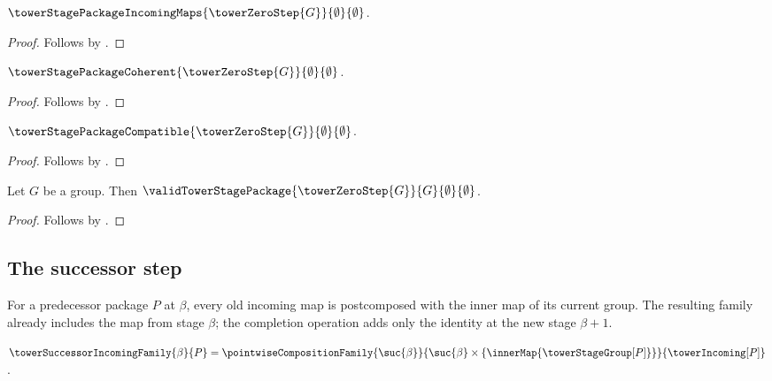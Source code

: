 \begin{proposition}\label{tower_zero_step_incoming_maps}
    $\towerStagePackageIncomingMaps
        {\towerZeroStep{G}}{\emptyset}{\emptyset}$.
\end{proposition}
\begin{proof}
    Follows by
        .
\end{proof}

\begin{proposition}\label{tower_zero_step_is_coherent}
    $\towerStagePackageCoherent
        {\towerZeroStep{G}}{\emptyset}{\emptyset}$.
\end{proposition}
\begin{proof}
    Follows by
        .
\end{proof}

\begin{proposition}\label{tower_zero_step_compatible}
    $\towerStagePackageCompatible
        {\towerZeroStep{G}}{\emptyset}{\emptyset}$.
\end{proposition}
\begin{proof}
    Follows by
        .
\end{proof}

\begin{theorem}\label{tower_zero_step_valid}
    Let $G$ be a group.
    Then $\validTowerStagePackage
        {\towerZeroStep{G}}{G}{\emptyset}{\emptyset}$.
\end{theorem}
\begin{proof}
    Follows by
        .
\end{proof}

\subsection{The successor step}

For a predecessor package $P$ at $\beta$, every old incoming map is
postcomposed with the inner map of its current group.  The resulting family
already includes the map from stage $\beta$; the completion operation adds
only the identity at the new stage $\beta+1$.

\begin{definition}\label{tower_successor_incoming_family}
    $\towerSuccessorIncomingFamily{\beta}{P}=
        \pointwiseCompositionFamily{\suc{\beta}}
            {\suc{\beta}\times\{\innerMap{\towerStageGroup[P]}\}}
            {\towerIncoming[P]}$.
\end{definition}

